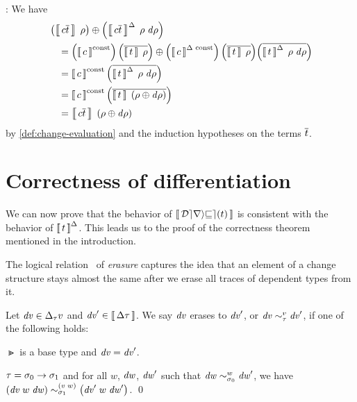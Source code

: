 \begin{optionalproof}
  \Case {}: We have
  \begin{align*}
    &         \Apply
                {\EvalIncWith*{\Const{c}{\List{t}}}{\Gr}{\D \Gr}}
                {\EvalWith*{\Const{c}{\List{t}}}{\Gr}}\\
    & \quad = \Apply
                {\EvalIncConst*
                  {\Const{c}}
                  {\List*{\EvalWith{t}{\Gr}}}
                  {\List*{\EvalIncWith{t}{\Gr}{\D \Gr}}}}
                {\EvalConst*
                  {\Const{c}}
                  {\List*{\EvalWith{t}{\Gr}}}}\\
    & \quad = \EvalConst
                {c}
                {\List*{\EvalIncWith{t}{\Gr}{\D \Gr}}}\\
    & \quad = \EvalConst
                {c}
                {\List*{\EvalWith{t}{\Apply*{\D \Gr}{\Gr}}}}\\
    & \quad = \EvalWith
                {\Const{c}{\List{t}}}
                {\Apply*{\D \Gr}{\Gr}}
  \end{align*}
  by \cref{def:change-evaluation} and
  the induction hypotheses on the terms $\List{t}$.
\end{optionalproof}

\section{Correctness of differentiation}
\label{sec:differentiate-correct}


We can now
prove that the behavior of $\Eval{\Derive{t}}$ is consistent with
the behavior of $\EvalInc{t}$. This leads us to the proof of the
correctness theorem mentioned in the introduction.

The logical relation~\citep[Chapter 8]{Mitchell1996foundations}
of \emph{erasure} captures the idea that an
element of a change structure stays almost the same after we
erase all traces of dependent types from it.

\begin{definition}[Erasure]\label{def:erasure}
Let $\D v \in \Change[\Gt]v$ and $\D v' \in \Eval{\Change\Gt}$.
We say $\mathit{dv}$ erases to $\mathit{dv}'$, or
$\Implements[\Gt][v]{\D v}{\D v'}$,
if one of the following holds:
\begin{subdefinition}
\item $\Gt$ is a base type and $\mathit{dv}=\mathit{dv}'$.
\item $\Gt=\Fun{\Gs_0}{\Gs_1}$ and for all $w$, $\mathit{dw}$, $\mathit{dw}'$
such that $\Implements[\Gs_0][w]{\D w}{\D w'}$, we have
$\Implements[\Gs_1][\App* v w]
{\App*{\App{\D v}w}{\D w}}
{\App*{\App{\D v'}w}{\D w'}}$. \qed
\end{subdefinition}
\end{definition}

